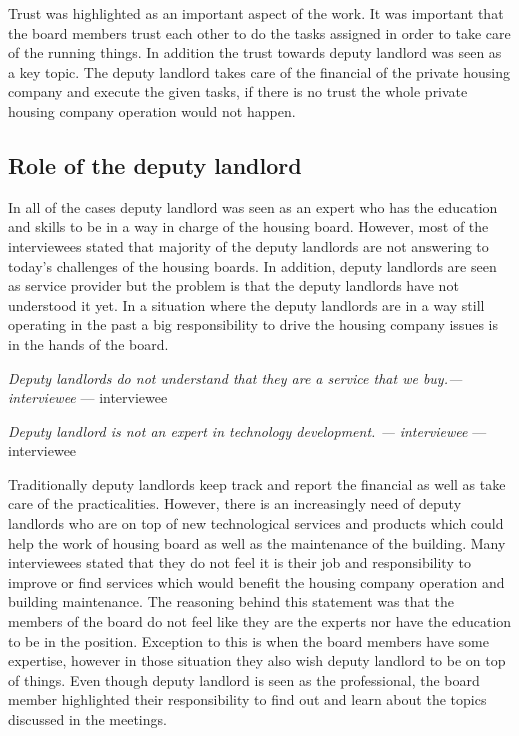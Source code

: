Trust was highlighted as an important aspect of the work. It was important that the board members trust each other to do the tasks assigned in order to take care of the running things. In addition the trust towards deputy landlord was seen as a key topic. The deputy landlord takes care of the financial of the private housing company and execute the given tasks, if there is no trust the whole private housing company operation would not happen.

\subsection{Role of the deputy landlord}

In all of the cases deputy landlord was seen as an expert who has the education and skills to be in a way in charge of the housing board. However, most of the interviewees stated that majority of the deputy landlords are not answering to today's challenges of the housing boards. In addition, deputy landlords are seen as service provider but the problem is that the deputy landlords have not understood it yet. In a situation where the deputy landlords are in a way still operating in the past a big responsibility to drive the housing company issues is in the hands of the board.

\begin{displayquote}
\textit{Deputy landlords do not understand that they are a service that
we buy.— interviewee} --- interviewee
\end{displayquote}

\begin{displayquote}
\textit{Deputy landlord is not an expert in technology development. —
interviewee} --- interviewee
\end{displayquote}

Traditionally deputy landlords keep track and report the financial as well as take care of the practicalities. However, there is an increasingly need of deputy landlords who are on top of new technological services and products which could help the work of housing board as well as the maintenance of the building. Many interviewees stated that they do not feel it is their job and responsibility to improve or find services which would benefit the housing company operation and building maintenance. The reasoning behind this statement was that the members of the board do not feel like they are the experts nor have the education to be in the position. Exception to this is when the board members have some expertise, however in those situation they also wish deputy landlord to be on top of things. Even though deputy landlord is seen as the professional, the board member highlighted their responsibility to find out and learn about the topics discussed in the meetings.

